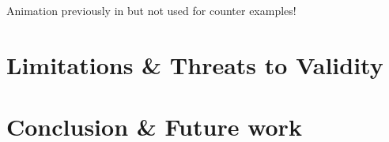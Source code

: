 \documentclass[runningheads]{llncs}
\begin{document}

\cite{krauterFormalizationAnalysisBPMN2023,krauterHigherorderTransformationApproach2023}

\cite{vangorpVisualTokenbasedFormalization2013}

\cite{corradiniBProVeToolSupport2017,corradiniFormalApproachAnalysis2021}

\cite{houhouFirstOrderLogicSemantics2019,houhouFirstOrderLogicVerification2022}

Animation previously in \cite{corradiniFormalisingAnimatingMultiple2022,camundaservicesgmbhBpmnjsTokenSimulation2024} but not used for counter examples!


\section{Limitations \& Threats to Validity}



\section{Conclusion \& Future work}





\end{document}
